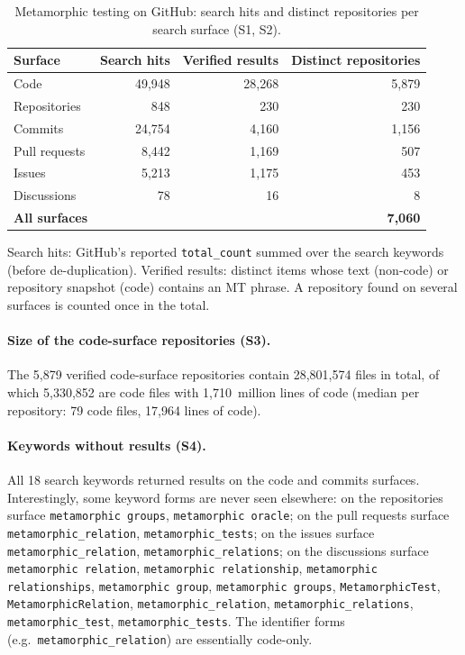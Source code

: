 \documentclass[11pt,a4paper]{article}
\begin{document}
\begin{table}[htbp]
\centering
\small
\caption{Metamorphic testing on GitHub: search hits and distinct repositories per search surface (S1, S2).}
\label{tab:mt-search}
\begin{tabular}{@{}lrrr@{}}
\toprule
Surface & Search hits & Verified results & Distinct repositories \\
\midrule
Code & 49,948 & 28,268 & 5,879 \\
Repositories & 848 & 230 & 230 \\
Commits & 24,754 & 4,160 & 1,156 \\
Pull requests & 8,442 & 1,169 & 507 \\
Issues & 5,213 & 1,175 & 453 \\
Discussions & 78 & 16 & 8 \\
\midrule
\textbf{All surfaces} &  &  & \textbf{7,060} \\
\bottomrule
\end{tabular}
\par\smallskip\parbox{0.94\linewidth}{\footnotesize Search hits: GitHub's reported \texttt{total\_count} summed over the search keywords (before de-duplication). Verified results: distinct items whose text (non-code) or repository snapshot (code) contains an MT phrase. A repository found on several surfaces is counted once in the total.}
\end{table}

\paragraph{Size of the code-surface repositories (S3).} The 5,879 verified code-surface repositories contain 28,801,574 files in total, of which 5,330,852 are code files with 1,710~million lines of code (median per repository: 79 code files, 17,964 lines of code).

\paragraph{Keywords without results (S4).} All 18 search keywords returned results on the code and commits surfaces. Interestingly, some keyword forms are never seen elsewhere: on the repositories surface \texttt{metamorphic groups}, \texttt{metamorphic oracle}; on the pull requests surface \texttt{metamorphic\_relation}, \texttt{metamorphic\_tests}; on the issues surface \texttt{metamorphic\_relation}, \texttt{metamorphic\_relations}; on the discussions surface \texttt{metamorphic relation}, \texttt{metamorphic relationship}, \texttt{metamorphic relationships}, \texttt{metamorphic group}, \texttt{metamorphic groups}, \texttt{MetamorphicTest}, \texttt{MetamorphicRelation}, \texttt{metamorphic\_relation}, \texttt{metamorphic\_relations}, \texttt{metamorphic\_test}, \texttt{metamorphic\_tests}. The identifier forms (e.g.\ \texttt{metamorphic\_relation}) are essentially code-only.
\end{document}

